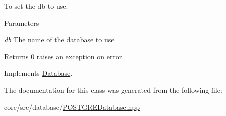 To set the db to use. 


\begin{DoxyParams}{Parameters}
\item[{\em db}]The name of the database to use \end{DoxyParams}
\begin{DoxyReturn}{Returns}
0 raises an exception on error 
\end{DoxyReturn}


Implements \hyperlink{classDatabase_aeba15395d2a36faf73dcb995695b9204}{Database}.



The documentation for this class was generated from the following file:\begin{DoxyCompactItemize}
\item 
core/src/database/\hyperlink{POSTGREDatabase_8hpp}{POSTGREDatabase.hpp}\end{DoxyCompactItemize}
